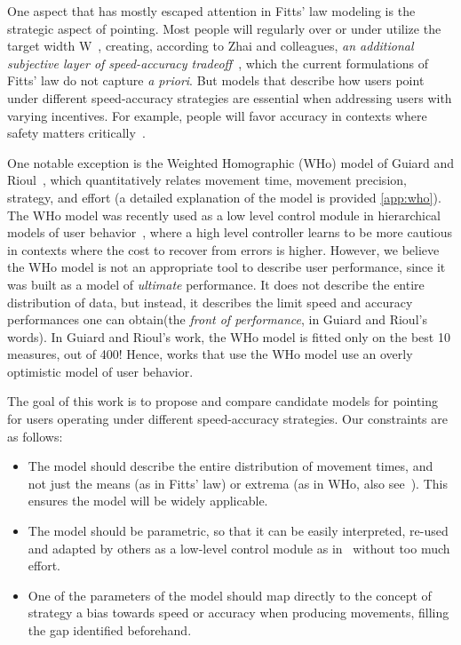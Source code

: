 \documentclass[manuscript,review,anonymous]{acmart}
\begin{document}
One aspect that has mostly escaped attention in Fitts' law modeling is the strategic aspect of pointing. Most people will regularly over or under utilize the target width W~\cite{soukoreff2004}, creating, according to Zhai and colleagues, \textit{an additional subjective layer of speed-accuracy tradeoff}~\cite{zhai2004nominal}, which the current formulations of Fitts' law do not capture \textit{a priori}. But models that describe how users point under different speed-accuracy strategies are essential when addressing users with varying incentives.
For example, people will favor accuracy in contexts where safety matters critically~\cite{guiard2011b}.



One notable exception is the Weighted Homographic (WHo) model of Guiard and Rioul~\cite{guiard2015}, which quantitatively relates movement time, movement precision, strategy, and effort (a detailed explanation of the model is provided \autoref{app:who}). The WHo model was recently used as a low level control module in hierarchical models of user behavior~\cite{jokinen2021, langerak2022}, where a high level controller learns to be more cautious in contexts where the cost to recover from errors is higher.
However, we believe the WHo model is not an appropriate tool to describe user performance, since it was built as a model of \textit{ultimate} performance.
It does not describe the entire distribution of data, but instead, it describes the limit speed and accuracy performances one can obtain(the \textit{front of performance}, in Guiard and Rioul's words). In Guiard and Rioul's work, the WHo model is fitted only on the best 10 measures, out of 400! Hence, works that use the WHo model use an overly optimistic model of user behavior.


The goal of this work is to propose and compare candidate models for pointing for users operating under different speed-accuracy strategies. Our constraints are as follows:
\begin{itemize}
	\item The model should describe the entire distribution of movement times, and not just the means (as in Fitts' law) or extrema (as in WHo, also see~\cite{gori2017two, gori2019, li2024}). This ensures the model will be widely applicable.
	\item The model should be parametric, so that it can be easily interpreted, re-used and adapted by others \eg as a low-level control module as in~\cite{jokinen2021,langerak2022} without too much effort.
	\item One of the parameters of the model should map directly to the concept of strategy \ie a bias towards speed or accuracy when producing movements, filling the gap identified beforehand.
\end{itemize}
\end{document}
